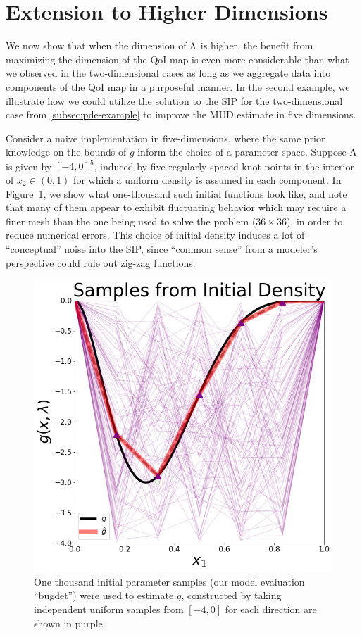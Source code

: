 \section{Extension to Higher Dimensions}\label{sec:mud-higher-dimensions}
We now show that when the dimension of ${\Lambda}$ is higher, the benefit from maximizing the dimension of the QoI map is even more considerable than what we observed in the two-dimensional cases as long as we aggregate data into components of the QoI map in a purposeful manner.
In the second example, we illustrate how we could utilize the solution to the SIP for the two-dimensional case from \ref{subsec:pde-example} to improve the MUD estimate in five dimensions.

Consider a naive implementation in five-dimensions, where the same prior knowledge on the bounds of $g$ inform the choice of a parameter space.
Suppose ${\Lambda}$ is given by $[-4, 0]^5$, induced by five regularly-spaced knot points in the interior of $x_2 \in (0,1)$ for which a uniform density is assumed in each component.
In Figure~\ref{fig:pde-highd-initial-5d}, we show what one-thousand such initial functions look like, and note that many of them appear to exhibit fluctuating behavior which may require a finer mesh than the one being used to solve the problem ($36\times36$), in order to reduce numerical errors.
This choice of initial density induces a lot of ``conceptual'' noise into the SIP, since ``common sense'' from a modeler's perspective could rule out zig-zag functions.

\begin{figure}
\centering
  \includegraphics[width=0.475\linewidth]{figures/pde-highd/pde-highd_init_D5.png}
\caption{
One thousand initial parameter samples (our model evaluation ``bugdet'') were used to estimate $g$, constructed by taking independent uniform samples from $[-4, 0]$ for each direction are shown in purple.
}
\label{fig:pde-highd-initial-5d}
\end{figure}

